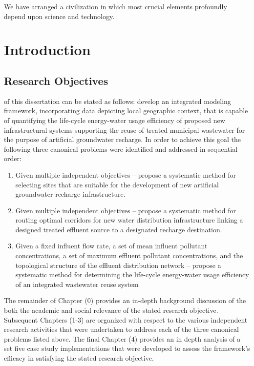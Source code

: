 \begin{savequote}[75mm]
We have arranged a civilization in which most crucial elements profoundly depend upon science and technology.
\end{savequote}

\chapter{Introduction}
\label{Introduction}

\newpage

\section{Research Objectives}

 of this dissertation can be stated as follows: develop an integrated modeling framework, incorporating data depicting local geographic context, that is capable of quantifying the life-cycle energy-water usage efficiency of proposed new infrastructural systems supporting the reuse of treated municipal wastewater for the purpose of artificial groundwater recharge. In order to achieve this goal the following three canonical problems were identified and addressed in sequential order:

    \begin{enumerate}
         
        \item Given multiple independent objectives -- propose a systematic method for selecting sites that are suitable for the development of new artificial groundwater recharge infrastructure.   
        \item Given multiple independent objectives -- propose a systematic method for routing optimal corridors for new water distribution infrastructure linking a designed treated effluent source to a designated recharge destination.
        \item Given a fixed influent flow rate, a set of mean influent pollutant concentrations, a set of maximum effluent pollutant concentrations, and the topological structure of the effluent distribution network -- propose a systematic method for determining the life-cycle energy-water usage efficiency of an integrated wastewater reuse system 
    
    \end{enumerate}
    
The remainder of Chapter (0) provides an in-depth background discussion of the both the academic and social relevance of the stated research objective. Subsequent Chapters (1-3) are organized with respect to the various independent research activities that were undertaken to address each of the three canonical problems listed above. The final Chapter (4) provides an in depth analysis of a set five case study implementations that were developed to assess the framework's efficacy in satisfying the stated research objective. 

